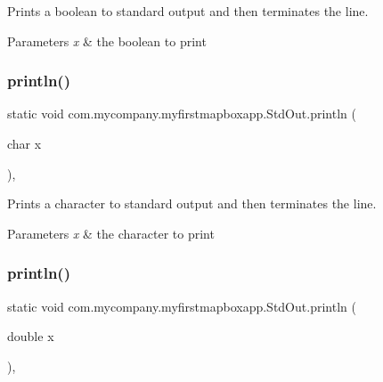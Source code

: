 Prints a boolean to standard output and then terminates the line.


\begin{DoxyParams}{Parameters}
{\em x} & the boolean to print \\
\hline
\end{DoxyParams}
\mbox{\label{classcom_1_1mycompany_1_1myfirstmapboxapp_1_1_std_out_ad316f91494b4f1d9be26ce888769f625}} 
\subsubsection{\texorpdfstring{println()}{println()}\hspace{0.1cm}{\footnotesize\ttfamily [4/10]}}
{\footnotesize\ttfamily static void com.\+mycompany.\+myfirstmapboxapp.\+Std\+Out.\+println (\begin{DoxyParamCaption}\item[{char}]{x }\end{DoxyParamCaption})\hspace{0.3cm}{\ttfamily [inline]}, {\ttfamily [static]}}

Prints a character to standard output and then terminates the line.


\begin{DoxyParams}{Parameters}
{\em x} & the character to print \\
\hline
\end{DoxyParams}
\mbox{\label{classcom_1_1mycompany_1_1myfirstmapboxapp_1_1_std_out_a0e8bcedeb6a8692f02da9cb5b5a8ecbe}} 
\subsubsection{\texorpdfstring{println()}{println()}\hspace{0.1cm}{\footnotesize\ttfamily [5/10]}}
{\footnotesize\ttfamily static void com.\+mycompany.\+myfirstmapboxapp.\+Std\+Out.\+println (\begin{DoxyParamCaption}\item[{double}]{x }\end{DoxyParamCaption})\hspace{0.3cm}{\ttfamily [inline]}, {\ttfamily [static]}}

